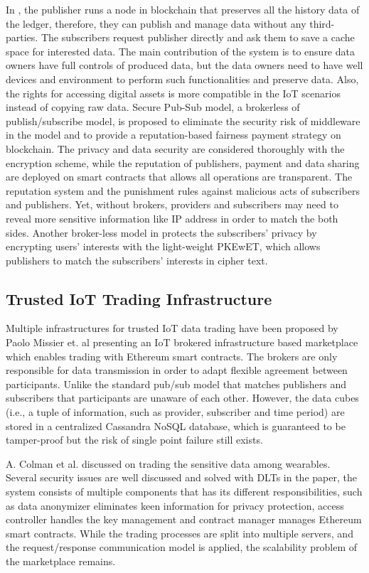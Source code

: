 \documentclass[conference]{IEEEtran}
\begin{document}
In \cite{userCentricData}, the publisher runs a node in blockchain that preserves all the history data of the ledger, therefore, they can publish and manage data without any third-parties. The subscribers request publisher directly and ask them to save a cache space for interested data. The main contribution of the system is to ensure data owners have full controls of produced data, but the data owners need to have well devices and environment to perform such functionalities and preserve data. Also, the rights for accessing digital assets is more compatible in the IoT scenarios instead of copying raw data. Secure Pub-Sub model\cite{SPS}, a brokerless of publish/subscribe model, is proposed to eliminate the security risk of middleware in the model and to provide a reputation-based fairness payment strategy on blockchain. The privacy and data security are considered thoroughly with the encryption scheme, while the reputation of publishers, payment and data sharing are deployed on smart contracts that allows all operations are transparent. The reputation system and the punishment rules against malicious acts of subscribers and publishers. Yet, without brokers, providers and subscribers may need to reveal more sensitive information like IP address in order to match the both sides. Another broker-less model in \cite{PrivacyPreservPubSub} protects the subscribers' privacy by encrypting users' interests with the light-weight PKEwET\cite{PKEwET}, which allows publishers to match the subscribers' interests in cipher text.

\subsection{Trusted IoT Trading Infrastructure}
Multiple infrastructures for trusted IoT data trading have been proposed by Paolo Missier et. al\cite{MindMyValue} presenting an IoT brokered infrastructure based marketplace which enables trading with Ethereum smart contracts. The brokers are only responsible for data transmission in order to adapt flexible agreement between participants. Unlike the standard pub/sub model that matches publishers and subscribers that participants are unaware of each other. However, the data cubes (i.e., a tuple of information, such as provider, subscriber and time period) are stored in a centralized Cassandra NoSQL database, which is guaranteed to be tamper-proof but the risk of single point failure still exists.

A. Colman et al. \cite{TrustedMarketplaceWearable} discussed on trading the sensitive data among wearables. Several security issues are well discussed and solved with DLTs in the paper, the system consists of multiple components that has its different responsibilities, such as data anonymizer eliminates keen information for privacy protection, access controller handles the key management and contract manager manages Ethereum smart contracts. While the trading processes are split into multiple servers, and the request/response communication model is applied, the scalability problem of the marketplace remains.
\end{document}

